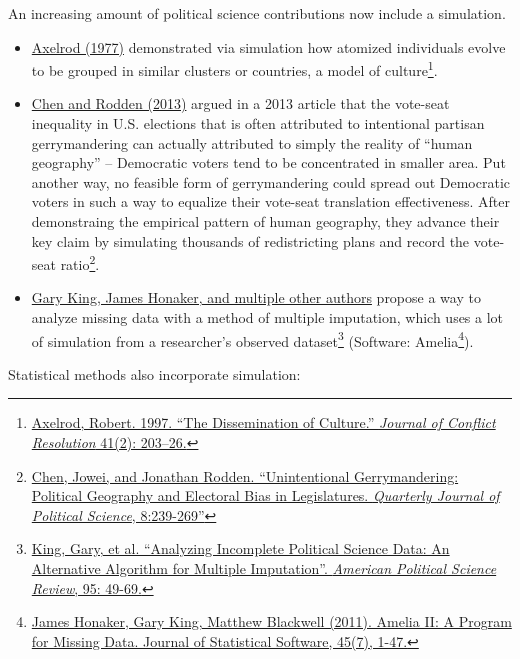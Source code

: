 \documentclass[]{book}
\providecommand{\tightlist}{%
  \setlength{\itemsep}{0pt}\setlength{\parskip}{0pt}}
\let\rmarkdownfootnote\footnote%
\def\footnote{\protect\rmarkdownfootnote}
\theoremstyle{definition}
\theoremstyle{definition}
\theoremstyle{definition}
\theoremstyle{remark}
\begin{document}
An increasing amount of political science contributions now include a
simulation.

\begin{itemize}
\tightlist
\item
  \href{http://www-personal.umich.edu/~axe/research/Dissemination.pdf}{Axelrod
  (1977)} demonstrated via simulation how atomized individuals evolve to
  be grouped in similar clusters or countries, a model of
  culture\footnote{\href{http://www-personal.umich.edu/~axe/research/Dissemination.pdf}{Axelrod,
    Robert. 1997. ``The Dissemination of Culture.'' \emph{Journal of
    Conflict Resolution} 41(2): 203--26.}}.
\item
  \href{http://www-personal.umich.edu/~jowei/florida.pdf}{Chen and
  Rodden (2013)} argued in a 2013 article that the vote-seat inequality
  in U.S. elections that is often attributed to intentional partisan
  gerrymandering can actually attributed to simply the reality of
  ``human geography'' -- Democratic voters tend to be concentrated in
  smaller area. Put another way, no feasible form of gerrymandering
  could spread out Democratic voters in such a way to equalize their
  vote-seat translation effectiveness. After demonstraing the empirical
  pattern of human geography, they advance their key claim by simulating
  thousands of redistricting plans and record the vote-seat
  ratio\footnote{\href{http://www-personal.umich.edu/~jowei/florida.pdf}{Chen,
    Jowei, and Jonathan Rodden. ``Unintentional Gerrymandering:
    Political Geography and Electoral Bias in Legislatures.
    \emph{Quarterly Journal of Political Science}, 8:239-269''}}.
\item
  \href{https://gking.harvard.edu/files/abs/evil-abs.shtml}{Gary King,
  James Honaker, and multiple other authors} propose a way to analyze
  missing data with a method of multiple imputation, which uses a lot of
  simulation from a researcher's observed dataset\footnote{\href{https://gking.harvard.edu/files/abs/evil-abs.shtml}{King,
    Gary, et al. ``Analyzing Incomplete Political Science Data: An
    Alternative Algorithm for Multiple Imputation''. \emph{American
    Political Science Review}, 95: 49-69.}} (Software: Amelia\footnote{\href{http://www.jstatsoft.org/v45/i07/}{James
    Honaker, Gary King, Matthew Blackwell (2011). Amelia II: A Program
    for Missing Data. Journal of Statistical Software, 45(7), 1-47.}}).
\end{itemize}

Statistical methods also incorporate simulation:
\end{document}
